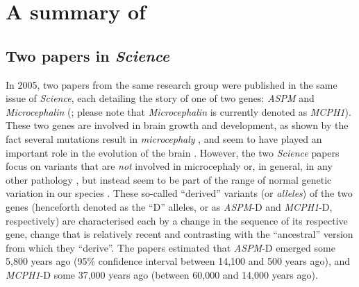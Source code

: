 \documentclass[twoside,onecolumn]{article}
\begin{document}

\section{A summary of \citet{dediu_ladd_2007}} \label{summary_dediu_ladd}

\subsection{Two papers in \textit{Science}}

In 2005, two papers from the same research group were published in the same issue of \textit{Science}, each detailing the story of one of two genes: \textit{ASPM} \citep{mekelbobrov_aspm_2005} and \textit{Microcephalin} (\citealp{evans_microcephalin_2005}; please note that \textit{Microcephalin} is currently denoted as \textit{MCPH1}).
These two genes are involved in brain growth and development, as shown by the fact several mutations result in \textit{microcephaly} \citep{cox_microcephaly_2006}, and seem to have played an important role in the evolution of the brain \citep{ali_positive_2008,montgomery_adaptive_2011,montgomery_microcephaly_2014}.
However, the two \textit{Science} papers focus on variants that are \emph{not} involved in microcephaly or, in general, in any other pathology \citep{mekelbobrov_aspm_2005,evans_microcephalin_2005}, but instead seem to be part of the range of normal genetic variation in our species \citep{jobling_human_2013}.
These so-called ``derived'' variants (or \emph{alleles}) of the two genes (henceforth denoted as the ``D'' alleles, or as \textit{ASPM}-D and \textit{MCPH1}-D, respectively) are characterised each by a change in the sequence of its respective gene, change that is relatively recent and contrasting with the ``ancestral'' version from which they ``derive''.
The papers estimated that \textit{ASPM}-D emerged some 5,800 years ago (95\% confidence interval between 14,100 and 500 years ago), and \textit{MCPH1}-D some 37,000 years ago (between 60,000 and 14,000 years ago).
\end{document}
